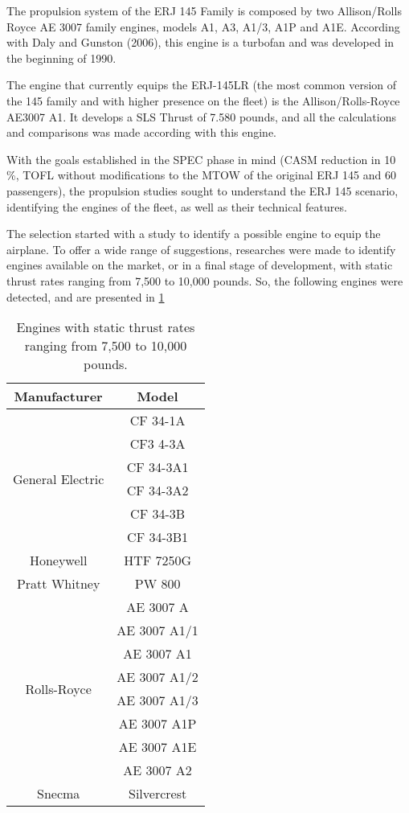 The propulsion system of the ERJ 145 Family is composed by two Allison/Rolls Royce AE 3007 family engines, models A1, A3, A1/3, A1P and A1E. According with Daly and Gunston (2006), this engine is a turbofan and was developed in the beginning of 1990.

The engine that currently equips the ERJ-145LR (the most common version of the 145 family and with higher presence on the fleet) is the Allison/Rolls-Royce AE3007 A1. It develops a SLS Thrust of 7.580 pounds, and all the calculations and comparisons was made according with this engine.

With the goals established in the SPEC phase in mind (CASM reduction in 10 \%, TOFL without modifications to the MTOW of the original ERJ 145 and 60 passengers), the propulsion studies sought to understand the ERJ 145 scenario, identifying the engines of the fleet, as well as their technical features.

The selection started with a study to identify a possible engine to equip the airplane. To offer a wide range of suggestions, researches were made to identify engines available on the market, or in a final stage of development, with static thrust rates ranging from 7,500 to 10,000 pounds. So, the following engines were detected, and are presented in \ref{tab:EngineThrust}

\begin{table}[htbp]
  \centering
  \caption{Engines with static thrust rates ranging from 7,500 to 10,000 pounds.}
    \begin{tabular}{cc}
    \toprule
    \textbf{Manufacturer} & \textbf{Model} \\
    \midrule
    \multirow{6}[12]{*}{General Electric} & CF 34-1A \\
          & CF3 4-3A \\
          & CF 34-3A1 \\
          & CF 34-3A2 \\
          & CF 34-3B \\
          & CF 34-3B1 \\
    Honeywell & HTF 7250G \\
    Pratt Whitney & PW 800 \\
    \multirow{8}[16]{*}{Rolls-Royce} & AE 3007 A \\
          & AE 3007 A1/1 \\
          & AE 3007 A1 \\
          & AE 3007 A1/2 \\
          & AE 3007 A1/3 \\
          & AE 3007 A1P \\
          & AE 3007 A1E \\
          & AE 3007 A2 \\
    Snecma & Silvercrest \\
    \bottomrule
    \end{tabular}%
  \label{tab:EngineThrust}%
\end{table}%

